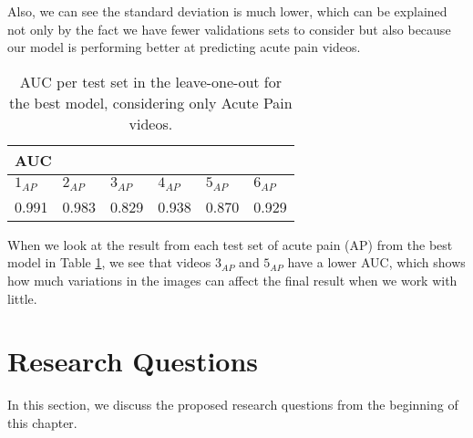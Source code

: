 Also, we can see the standard deviation is much lower, which can be explained not only by the fact we have fewer validations sets to consider but also because our model is performing better at predicting acute pain videos.

\begin{table}[h!tp]
\setlength{\tabcolsep}{3.41pt}
\centering
\caption{AUC per test set in the leave-one-out for the best model, considering only Acute Pain videos.}
\label{tab:auc_leave_one_out}
\begin{tabular}{llllll}
\hline
\multicolumn{6}{l}{AUC} \\ \hline
\multicolumn{1}{l|}{$1_{AP}$}    & \multicolumn{1}{l|}{$2_{AP}$}    & \multicolumn{1}{l|}{$3_{AP}$}    & \multicolumn{1}{l|}{$4_{AP}$}    & \multicolumn{1}{l|}{$5_{AP}$}    & $6_{AP}$   \\ \hline
\multicolumn{1}{l|}{0.991} & \multicolumn{1}{l|}{0.983} & \multicolumn{1}{l|}{0.829} & \multicolumn{1}{l|}{0.938} & \multicolumn{1}{l|}{0.870} & 0.929 \\ \hline
\end{tabular}
\end{table}

When we look at the result from each test set of acute pain (AP) from the best model in Table \ref{tab:auc_leave_one_out}, we see that videos $3_{AP}$ and $5_{AP}$ have a lower AUC, which shows how much variations in the images can affect the final result when we work with little.

\section{Research Questions}

In this section, we discuss the proposed research questions from the beginning of this chapter.
